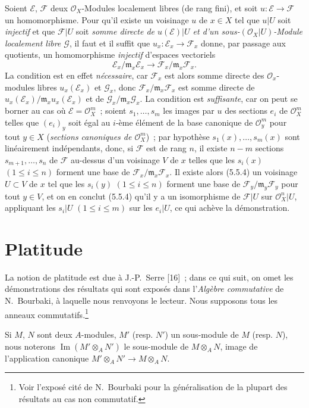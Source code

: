 \begin{env}[5.5.5]
\label{0.5.5.5-fr}
Soient $\mathcal{E}$, $\mathcal{F}$ deux $\mathcal{O}_X$-Modules localement
libres (de rang fini), et soit $u:\mathcal{E}\to\mathcal{F}$ un
homomorphisme. Pour qu'il existe un voisinage $u$ de $x\in X$ tel que $u|U$
soit \emph{injectif} et que $\mathcal{F}|U$ soit \emph{somme directe de
$u(\mathcal{E})|U$ et d'un sous-$(\mathcal{O}_X|U)$-Module localement libre
$\mathcal{G}$}, il faut et il suffit que
$u_x:\mathcal{E}_x\to\mathcal{F}_x$ donne, par passage aux quotients, un
homomorphisme \emph{injectif} d'espaces vectoriels
\[
  \mathcal{E}_x/\mathfrak{m}_x\mathcal{E}_x
  \longrightarrow
  \mathcal{F}_x/\mathfrak{m}_x\mathcal{F}_x.
\]
La condition est en effet \emph{nécessaire}, car $\mathcal{F}_x$ est alors
somme directe des $\mathcal{O}_x$-modules libres $u_x(\mathcal{E}_x)$ et
$\mathcal{G}_x$, donc $\mathcal{F}_x/\mathfrak{m}_x\mathcal{F}_x$ est somme
directe de
$u_x(\mathcal{E}_x)/\mathfrak{m}_x u_x(\mathcal{E}_x)$ et de
$\mathcal{G}_x/\mathfrak{m}_x\mathcal{G}_x$. La condition est
\emph{suffisante}, car on peut se borner au cas où
$\mathcal{E}=\mathcal{O}_X^m$~; soient $s_1,\ldots,s_m$ les images par $u$ des
sections $e_i$ de $\mathcal{O}_X^m$ telles que $(e_i)_y$ soit égal au $i$-ème
élément de la base canonique de $\mathcal{O}_y^m$ pour tout $y\in X$
(\emph{sections canoniques de $\mathcal{O}_X^m$})~; par hypothèse
$s_1(x),\ldots,s_m(x)$ sont linéairement indépendants, donc, si $\mathcal{F}$
est de rang $n$, il existe $n-m$ sections $s_{m+1},\ldots,s_n$ de
$\mathcal{F}$ au-dessus d'un voisinage $V$ de $x$ telles que les $s_i(x)$
$(1\leq i\leq n)$ forment une base de
$\mathcal{F}_x/\mathfrak{m}_x\mathcal{F}_x$. Il existe alors (5.5.4) un
voisinage $U\subset V$ de $x$ tel que les $s_i(y)$ $(1\leq i\leq n)$ forment
une base de $\mathcal{F}_y/\mathfrak{m}_y\mathcal{F}_y$ pour tout $y\in V$,
et on en conclut (5.5.4) qu'il y a un isomorphisme de $\mathcal{F}|U$ sur
$\mathcal{O}_X^n|U$, appliquant les $s_i|U$ $(1\leq i\leq m)$ sur les
$e_i|U$, ce qui achève la démonstration.
\end{env}

\section{Platitude}
\label{section:0.6-fr}

\begin{env}[6.0]
\label{0.6.0.0-fr}
La notion de platitude est due à J.-P.~Serre [16]~; dans ce qui suit, on omet
les démonstrations des résultats qui sont exposés dans l'\emph{Algèbre
commutative} de N.~Bourbaki, à laquelle nous renvoyons le lecteur. Nous
supposons tous les anneaux commutatifs.\footnote{Voir l'exposé cité de
N.~Bourbaki pour la généralisation de la plupart des résultats au cas non
commutatif.}


Si $M$, $N$ sont deux $A$-modules, $M'$ (resp. $N'$) un sous-module de $M$
(resp. $N$), nous noterons $\operatorname{Im}(M'\otimes_A N')$ le sous-module
de $M\otimes_A N$, image de l'application canonique
$M'\otimes_A N'\to M\otimes_A N$.
\end{env}

